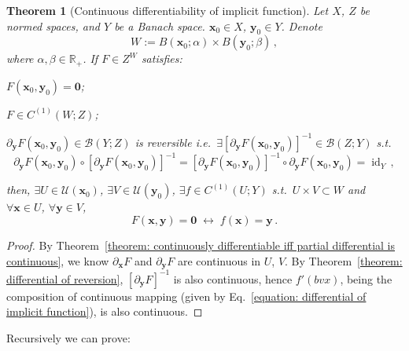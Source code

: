 \documentclass[openany]{book}
\theoremstyle{plain}
\newtheorem{theorem}{Theorem}[section] %
\theoremstyle{definition}
\newcommand*{\bv}{\boldsymbol} %
\newcommand*{\IFF}{\;\leftrightarrow\;} %
\DeclareMathOperator{\id}{id}
\begin{document}
\begin{theorem}[Continuous differentiability of implicit function]
	\label{theorem: continuous differentiability of implicit function}
	Let $X$, $Z$ be normed spaces, and $Y$ be a Banach space.
	$\bv x_0 \in X$, $\bv y_0 \in Y$. Denote
	\begin{equation*}
		W := B(\bv x_0; \alpha) \times B(\bv y_0; \beta)\,,
	\end{equation*}
	where $\alpha, \beta \in \mathbb R_+$.
	If $F \in Z^W$ satisfies:
	\begin{conditionlist}[label=\alph*)]
		\item $F(\bv x_0, \bv y_0) = \bv 0$;
		\item $F \in C^{(1)}(W; Z)$; 
		\item $\partial_{\bv y} F(\bv x_0, \bv y_0) \in \mathcal B(Y; Z)$ is reversible i.e.\ $\exists [\partial_{\bv y} F(\bv x_0, \bv y_0)]^{-1} \in \mathcal B(Z; Y)$ s.t.
		\begin{equation*}
			\partial_{\bv y} F(\bv x_0, \bv y_0) \circ [\partial_{\bv y} F(\bv x_0, \bv y_0)]^{-1} 
			= [\partial_{\bv y} F(\bv x_0, \bv y_0)]^{-1} \circ \partial_{\bv y} F(\bv x_0, \bv y_0) = \id_Y\,,
		\end{equation*}
	\end{conditionlist}
	then, $\exists U \in \mathscr U(\bv x_0)$, $\exists V \in \mathscr U(\bv y_0)$, $\exists f \in C^{(1)}(U; Y)$ s.t.\ $U \times V \subset W$ and $\forall \bv x \in U$, $\forall \bv y \in V$, 
	\begin{equation*}
		F(\bv x, \bv y) = \bv 0
		\IFF
		f(\bv x) = \bv y\,.
	\end{equation*}
\end{theorem}
\begin{proof}
	By Theorem~\ref{theorem: continuously differentiable iff partial differential is continuous}, we know $\partial_{\bv x} F$ and $\partial_{\bv y} F$ are continuous in $U$, $V$.
	By Theorem~\ref{theorem: differential of reversion}, $[\partial_{\bv y} F]^{-1}$ is also continuous, hence $f'(bv x)$, being the composition of continuous mapping (given by Eq.~\ref{equation: differential of implicit function}), is also continuous.
\end{proof}

Recursively we can prove:
\end{document}
